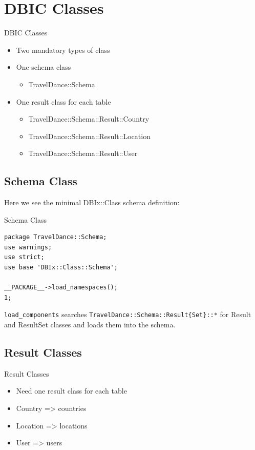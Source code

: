 \section{DBIC Classes}

\begin{frame}{DBIC Classes}
\begin{itemize}
\item Two mandatory types of class
\item One schema class
\begin{itemize}
\item TravelDance::Schema
\end{itemize}
\item One result class for each table
\begin{itemize}
\item TravelDance::Schema::Result::Country
\item TravelDance::Schema::Result::Location
\item TravelDance::Schema::Result::User
\end{itemize}
\end{itemize}
\end{frame}

\subsection{Schema Class}

Here we see the minimal DBIx::Class schema definition:

\begin{frame}[fragile]{Schema Class}
\begin{lstlisting}
package TravelDance::Schema;
use warnings;
use strict;
use base 'DBIx::Class::Schema';

__PACKAGE__->load_namespaces();
1;
\end{lstlisting}
\end{frame}

\verb|load_components| searches \verb|TravelDance::Schema::Result{Set}::*|
for Result and ResultSet classes and loads them into the schema.

\subsection{Result Classes}

\begin{frame}{Result Classes}
\begin{itemize}
\item Need one result class for each table
\item Country => countries
\item Location => locations
\item User => users
\end{itemize}
\end{frame}

